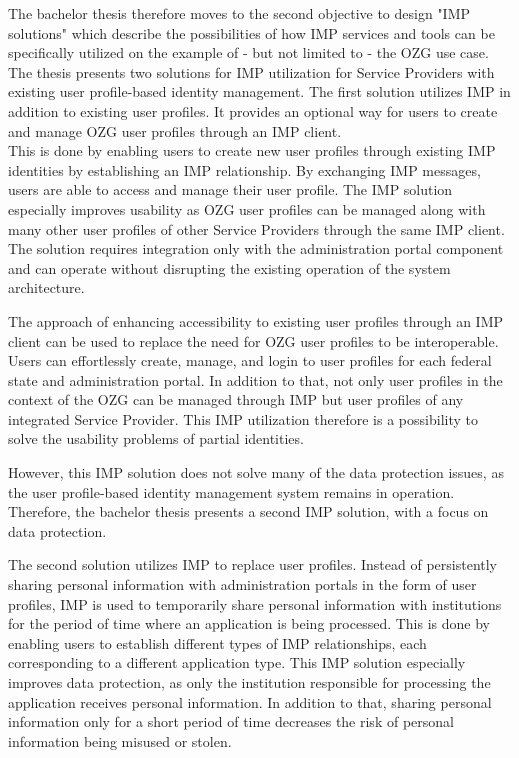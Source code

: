 The bachelor thesis therefore moves to the second objective to design "IMP solutions" which describe the possibilities of how IMP services and tools can be specifically utilized on the example of - but not limited to - the OZG use case. The thesis presents two solutions for IMP utilization for Service Providers with existing user profile-based identity management. The first solution utilizes IMP in addition to existing user profiles. It provides an optional way for users to create and manage OZG user profiles through an IMP client. \\
This is done by enabling users to create new user profiles through existing IMP identities by establishing an IMP relationship. By exchanging IMP messages, users are able to access and manage their user profile. The IMP solution especially improves usability as OZG user profiles can be managed along with many other user profiles of other Service Providers through the same IMP client. The solution requires integration only with the administration portal component and can operate without disrupting the existing operation of the system architecture. 

The approach of enhancing accessibility to existing user profiles through an IMP client can be used to replace the need for OZG user profiles to be interoperable. Users can effortlessly create, manage, and login to user profiles for each federal state and administration portal. In addition to that, not only user profiles in the context of the OZG can be managed through IMP but user profiles of any integrated Service Provider. This IMP utilization therefore is a possibility to solve the usability problems of partial identities.

However, this IMP solution does not solve many of the data protection issues, as the user profile-based identity management system remains in operation. Therefore, the bachelor thesis presents a second IMP solution, with a focus on data protection.

The second solution utilizes IMP to replace user profiles. Instead of persistently sharing personal information with administration portals in the form of user profiles, IMP is used to temporarily share personal information with institutions for the period of time where an application is being processed. This is done by enabling users to establish different types of IMP relationships, each corresponding to a different application type. This IMP solution especially improves data protection, as only the institution responsible for processing the application receives personal information. In addition to that, sharing personal information only for a short period of time decreases the risk of personal information being misused or stolen.

